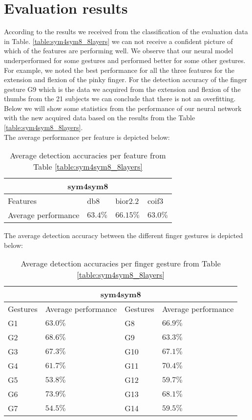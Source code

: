 \section{Evaluation results}
According to the results we received from the classification of the evaluation data in Table. \ref{table:sym4sym8_8layers} we can not receive a confident picture of which of the features are performing well. We observe that our neural model underperformed for some gestures and performed better for some other gestures. For example, we noted the best performance for all the three features for the extension and flexion of the pinky finger. For the detection accuracy of the finger gesture G9 which is the data we acquired from the extension and flexion of the thumbs from the 21 subjects  we can conclude that there is not an overfitting. Below we will show some statistics from the performance of our neural network with the new acquired data based on the results from the Table \ref{table:sym4sym8_8layers}.\\
The average performance per feature is depicted below:
\begin{table}[H]
\renewcommand{\arraystretch}{1.2}
\centering
\begin{tabular}{ |p{3.8cm}|p{1.4cm}|p{1.4cm}|p{1.4cm}|}
 \hline
 \multicolumn{4}{|c|}{sym4sym8} \\
 \hline
  Features & db8 & bior2.2 & coif3 \\
 \hline
 Average performance & $63.4\%$ & $66.15\%$ & $63.0\%$ \\
 \hline
\end{tabular}
\caption{Average detection accuracies per feature from Table \ref{table:sym4sym8_8layers}}
\end{table}
The average detection accuracy between the different finger gestures is depicted below: 
\begin{table}[H]
\renewcommand{\arraystretch}{1.2}
\centering
\begin{tabular}{|p{1.4cm}|p{2.2cm}|p{1.4cm}|p{2.2cm}|}
 \hline
 \multicolumn{4}{|c|}{sym4sym8} \\
 \hline
  Gestures & Average performance & Gestures & Average performance \\
 \hline
 G1 & $63.0\%$ & G8  & $66.9\%$\\
 G2 & $68.6\%$ & G9  & $63.3\%$\\
 G3 & $67.3\%$ & G10 & $67.1\%$\\
 G4 & $61.7\%$ & G11 & $70.4\%$\\
 G5 & $53.8\%$ & G12 & $59.7\%$\\
 G6 & $73.9\%$ & G13 & $68.1\%$\\
 G7 & $54.5\%$ & G14 & $59.5\%$\\
 \hline
\end{tabular}
\caption{Average detection accuracies per finger gesture from Table \ref{table:sym4sym8_8layers}}
\end{table}
